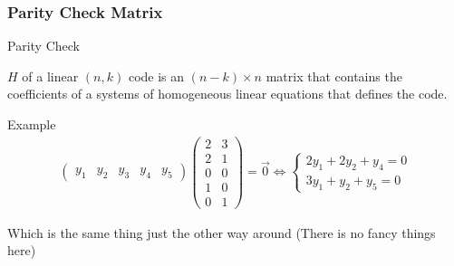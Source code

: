 \subsubsection{Parity Check Matrix}
    \begin{parag}{Parity Check}
        \begin{definition}
        $H$ of a linear $\left(n, k\right)$ code is an $\left(n-k\right) \times n$ matrix that contains the coefficients of a systems of homogeneous linear equations that defines the code.
        \end{definition}
       \begin{subparag}{Example}
           \begin{align*} 
        \begin{pmatrix} y_1 & y_2 & y_3 & y_4 & y_5 \end{pmatrix}  \begin{pmatrix} 2 & 3 \\ 2 & 1 \\ 0 & 0 \\ 1  & 0 \\ 0 & 1 \end{pmatrix} =  \vec{0} \iff 
        \begin{cases}
            2y_1 + 2y_2 + y_4 = 0\\
            3y_1 + y_2 + y_5 = 0
        \end{cases}
           \end{align*}
           \begin{framedremark}
           Which is the same thing just the other way around (There is no fancy things here)
           \end{framedremark}
       \end{subparag}
    \end{parag}
    
